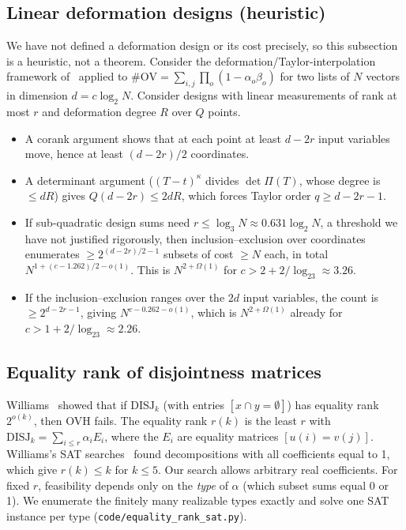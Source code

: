 \documentclass[11pt,a4paper]{article}
\theoremstyle{plain}
\theoremstyle{definition}
\theoremstyle{remark}
\newcommand{\OV}{\mathrm{OV}}
\newcommand{\DISJ}{\mathrm{DISJ}}
\newcommand{\code}[1]{\texttt{\small #1}}
\begin{document}
\subsection{Linear deformation designs (heuristic)}\label{sec:deform}
We have not defined a deformation design or its cost precisely, so this subsection is a heuristic, not a theorem.
Consider the deformation/Taylor-interpolation framework of~\cite{OpenAI26} applied to
$\#\OV=\sum_{i,j}\prod_o(1-\alpha_o\beta_o)$ for two lists of $N$ vectors in dimension $d=c\log_2N$. Consider designs
with linear measurements of rank at most $r$ and deformation degree $R$ over $Q$ points.
\begin{itemize}
  \item A corank argument shows that at each point at least $d-2r$ input variables move, hence at least $(d-2r)/2$
    coordinates.
  \item A determinant argument ($(T-t)^\kappa$ divides $\det\Pi(T)$, whose degree is $\le dR$) gives
    $Q(d-2r)\le2dR$, which forces Taylor order $q\ge d-2r-1$.
  \item If sub-quadratic design sums need $r\le\log_3N\approx0.631\log_2N$, a threshold we have not justified
    rigorously, then inclusion--exclusion over coordinates enumerates $\ge2^{(d-2r)/2-1}$ subsets of cost $\ge N$ each,
    in total $N^{1+(c-1.262)/2-o(1)}$. This is $N^{2+\Omega(1)}$ for $c>2+2/\log_23\approx3.26$.
  \item If the inclusion--exclusion ranges over the $2d$ input variables, the count is $\ge2^{d-2r-1}$, giving
    $N^{c-0.262-o(1)}$, which is $N^{2+\Omega(1)}$ already for $c>1+2/\log_23\approx2.26$.
\end{itemize}

\subsection{Equality rank of disjointness matrices}
Williams~\cite{Wil24} showed that if $\DISJ_k$ (with entries $[x\cap y=\emptyset]$) has equality rank $2^{o(k)}$, then
OVH fails. The equality rank $r(k)$ is the least $r$ with $\DISJ_k=\sum_{i\le r}\alpha_iE_i$, where the $E_i$ are
equality matrices $[u(i)=v(j)]$. Williams's SAT searches~\cite{Wil24} found decompositions with all coefficients
equal to 1, which give $r(k)\le k$ for $k\le5$. Our search allows arbitrary real coefficients. For fixed $r$, feasibility
depends only on the \emph{type} of $\alpha$ (which subset sums equal 0 or 1). We enumerate the finitely many realizable
types exactly and solve one SAT instance per type (\code{code/equality\_rank\_sat.py}).
\end{document}
